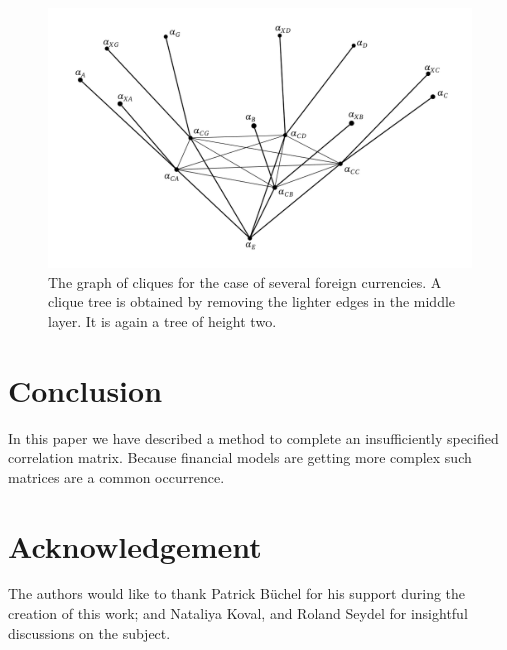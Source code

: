 \documentclass[11pt, a4paper]{article}
\begin{document}
\begin{figure}[hbt]
  \begin{center}
  	\includegraphics[width=12cm]{img/severalCurrCliques.png}
  \end{center}
  \caption{The graph of cliques for the case of several foreign currencies. A clique tree is obtained by removing the lighter edges in the middle layer. It is again a tree of height two.}\label{fig.severalCliques}
\end{figure}

\section{Conclusion}\label{sec.conclusion}
In this paper we have described a method to complete an insufficiently specified correlation matrix. Because financial models are getting more complex such matrices are a common occurrence. 



\section*{Acknowledgement}
The authors would like to thank Patrick B\"uchel for his support during the creation of this work; and Nataliya Koval, and Roland Seydel for insightful discussions on the subject. 
\end{document}
